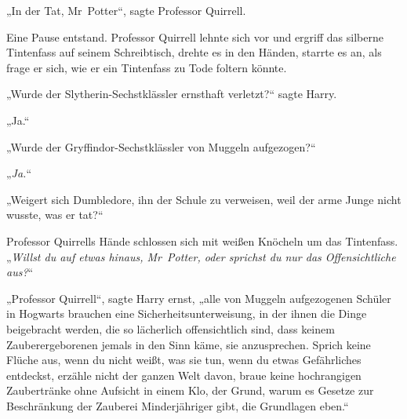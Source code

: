 „In der Tat, Mr~Potter“, sagte Professor Quirrell.

Eine Pause entstand. Professor Quirrell lehnte sich vor und ergriff das silberne Tintenfass auf seinem Schreibtisch, drehte es in den Händen, starrte es an, als frage er sich, wie er ein Tintenfass zu Tode foltern könnte.

„Wurde der Slytherin-Sechstklässler ernsthaft verletzt?“ sagte Harry.

„Ja.“

„Wurde der Gryffindor-Sechstklässler von Muggeln aufgezogen?“

„\emph{Ja.}“

„Weigert sich Dumbledore, ihn der Schule zu verweisen, weil der arme Junge nicht wusste, was er tat?“

Professor Quirrells Hände schlossen sich mit weißen Knöcheln um das Tintenfass.
„\emph{Willst du auf etwas hinaus, Mr~Potter, oder sprichst du nur das Offensichtliche aus?}“

„Professor Quirrell“, sagte Harry ernst, „alle von Muggeln aufgezogenen Schüler in Hogwarts brauchen eine Sicherheitsunterweisung, in der ihnen die Dinge beigebracht werden, die so lächerlich offensichtlich sind, dass keinem Zauberergeborenen jemals in den Sinn käme, sie anzusprechen. Sprich keine Flüche aus, wenn du nicht weißt, was sie tun, wenn du etwas Gefährliches entdeckst, erzähle nicht der ganzen Welt davon, braue keine hochrangigen Zaubertränke ohne Aufsicht in einem Klo, der Grund, warum es Gesetze zur Beschränkung der Zauberei Minderjähriger gibt, die Grundlagen eben.“

